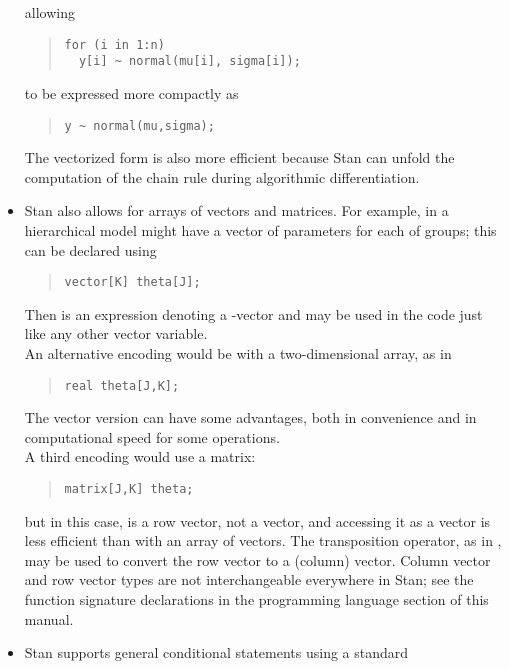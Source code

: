 \begin{itemize}
%
allowing
%
\begin{quote}
\begin{Verbatim}
for (i in 1:n) 
  y[i] ~ normal(mu[i], sigma[i]);
\end{Verbatim}
\end{quote}
%
to be expressed more compactly as 
%
\begin{quote}
\begin{Verbatim}
y ~ normal(mu,sigma);
\end{Verbatim}
\end{quote}
%
The vectorized form is also more efficient because Stan can unfold the
computation of the chain rule during algorithmic differentiation.
%
\item Stan also allows for arrays of vectors and matrices.
  For example, in a hierarchical model might have a vector of 
  parameters for each of  groups; this can be declared using
\begin{quote}
\begin{Verbatim}
vector[K] theta[J];
\end{Verbatim}
\end{quote}
%
Then  is an expression denoting a -vector and
may be used in the code just like any other vector variable.
\\[6pt]
An alternative encoding would be with a two-dimensional array, as in
\begin{quote}
\begin{Verbatim}
real theta[J,K];
\end{Verbatim}
\end{quote}
%
The vector version can have some advantages, both in convenience and
in computational speed for some operations.
\\[6pt]
A third encoding would use a matrix:
%
\begin{quote}
\begin{Verbatim}
matrix[J,K] theta;
\end{Verbatim}
\end{quote}
%
but in this case,  is a row vector, not a vector, and
accessing it as a vector is less efficient than with an array of
vectors.  The transposition operator, as in , may be
used to convert the row vector  to a (column) vector.
Column vector and row vector types are not interchangeable everywhere
in Stan; see the function signature declarations in the programming
language section of this manual.
%
\item Stan supports general conditional statements using a standard

\end{itemize}
